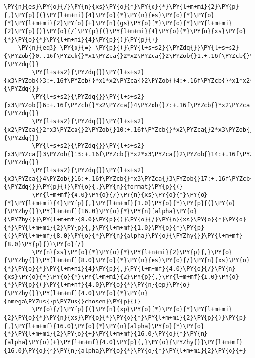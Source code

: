 \begin{Verbatim}[commandchars=\\\{\}]
        \PY{n}{es}\PY{o}{/}\PY{n}{xs}\PY{o}{*}\PY{o}{*}\PY{l+m+mi}{2}\PY{p}{,}\PY{p}{(}\PY{l+m+mi}{4}\PY{o}{*}\PY{n}{es}\PY{o}{*}\PY{o}{*}\PY{l+m+mi}{2}\PY{o}{+}\PY{n}{gs}\PY{o}{*}\PY{o}{*}\PY{l+m+mi}{2}\PY{p}{)}\PY{o}{/}\PY{p}{(}\PY{l+m+mi}{4}\PY{o}{*}\PY{n}{xs}\PY{o}{*}\PY{o}{*}\PY{l+m+mi}{4}\PY{p}{)}\PY{p}{)}
    \PY{n}{eq3} \PY{o}{=} \PY{p}{(}\PY{l+s+s2}{\PYZdq{}}\PY{l+s+s2}{\PYZob{}0:.16f\PYZcb{}*x1\PYZca{}2*x2\PYZca{}2\PYZob{}1:+.16f\PYZcb{}*x1*x2\PYZca{}3\PYZob{}2:+.16f\PYZcb{}*x1*x2\PYZca{}2*}\PY{l+s+s2}{\PYZdq{}}
        \PY{l+s+s2}{\PYZdq{}}\PY{l+s+s2}{x3\PYZob{}3:+.16f\PYZcb{}*x1*x2\PYZca{}2\PYZob{}4:+.16f\PYZcb{}*x1*x2*x3\PYZca{}2\PYZob{}5:+.16f\PYZcb{}*x1*x2*}\PY{l+s+s2}{\PYZdq{}}
        \PY{l+s+s2}{\PYZdq{}}\PY{l+s+s2}{x3\PYZob{}6:+.16f\PYZcb{}*x2\PYZca{}4\PYZob{}7:+.16f\PYZcb{}*x2\PYZca{}3*x3\PYZob{}8:+.16f\PYZcb{}*x2\PYZca{}3\PYZob{}9:+.16f\PYZcb{}*}\PY{l+s+s2}{\PYZdq{}}
        \PY{l+s+s2}{\PYZdq{}}\PY{l+s+s2}{x2\PYZca{}2*x3\PYZca{}2\PYZob{}10:+.16f\PYZcb{}*x2\PYZca{}2*x3\PYZob{}11:+.16f\PYZcb{}*x2\PYZca{}2\PYZob{}12:+.16f\PYZcb{}*x2*}\PY{l+s+s2}{\PYZdq{}}
        \PY{l+s+s2}{\PYZdq{}}\PY{l+s+s2}{x3\PYZca{}3\PYZob{}13:+.16f\PYZcb{}*x2*x3\PYZca{}2\PYZob{}14:+.16f\PYZcb{}*x2*x3\PYZob{}15:+.16f\PYZcb{}*}\PY{l+s+s2}{\PYZdq{}}
        \PY{l+s+s2}{\PYZdq{}}\PY{l+s+s2}{x3\PYZca{}4\PYZob{}16:+.16f\PYZcb{}*x3\PYZca{}3\PYZob{}17:+.16f\PYZcb{}*x3\PYZca{}2\PYZob{}18:+.16f\PYZcb{}*x3;}\PY{l+s+s2}{\PYZdq{}}\PY{p}{)}\PY{o}{.}\PY{n}{format}\PY{p}{(}
        \PY{l+m+mf}{4.0}\PY{o}{/}\PY{n}{xs}\PY{o}{*}\PY{o}{*}\PY{l+m+mi}{4}\PY{p}{,}\PY{l+m+mf}{1.0}\PY{o}{*}\PY{p}{(}\PY{o}{\PYZhy{}}\PY{l+m+mf}{16.0}\PY{o}{*}\PY{n}{alpha}\PY{o}{\PYZhy{}}\PY{l+m+mf}{8.0}\PY{p}{)}\PY{o}{/}\PY{n}{xs}\PY{o}{*}\PY{o}{*}\PY{l+m+mi}{2}\PY{p}{,}\PY{l+m+mf}{1.0}\PY{o}{*}\PY{p}{(}\PY{l+m+mf}{8.0}\PY{o}{*}\PY{n}{alpha}\PY{o}{\PYZhy{}}\PY{l+m+mf}{8.0}\PY{p}{)}\PY{o}{/}
        \PY{n}{xs}\PY{o}{*}\PY{o}{*}\PY{l+m+mi}{2}\PY{p}{,}\PY{o}{\PYZhy{}}\PY{l+m+mf}{8.0}\PY{o}{*}\PY{n}{es}\PY{o}{/}\PY{n}{xs}\PY{o}{*}\PY{o}{*}\PY{l+m+mi}{4}\PY{p}{,}\PY{l+m+mf}{4.0}\PY{o}{/}\PY{n}{xs}\PY{o}{*}\PY{o}{*}\PY{l+m+mi}{2}\PY{p}{,}\PY{l+m+mf}{1.0}\PY{o}{*}\PY{p}{(}\PY{l+m+mf}{4.0}\PY{o}{*}\PY{n}{ep}\PY{o}{\PYZhy{}}\PY{l+m+mf}{4.0}\PY{o}{*}\PY{n}{omega\PYZus{}p\PYZus{}chosen}\PY{p}{)}
        \PY{o}{/}\PY{p}{(}\PY{n}{xp}\PY{o}{*}\PY{o}{*}\PY{l+m+mi}{2}\PY{o}{*}\PY{n}{xs}\PY{o}{*}\PY{o}{*}\PY{l+m+mi}{2}\PY{p}{)}\PY{p}{,}\PY{l+m+mf}{16.0}\PY{o}{*}\PY{n}{alpha}\PY{o}{*}\PY{o}{*}\PY{l+m+mi}{2}\PY{o}{+}\PY{l+m+mf}{16.0}\PY{o}{*}\PY{n}{alpha}\PY{o}{+}\PY{l+m+mf}{4.0}\PY{p}{,}\PY{o}{\PYZhy{}}\PY{l+m+mf}{16.0}\PY{o}{*}\PY{n}{alpha}\PY{o}{*}\PY{o}{*}\PY{l+m+mi}{2}\PY{o}{+}

\end{Verbatim}
